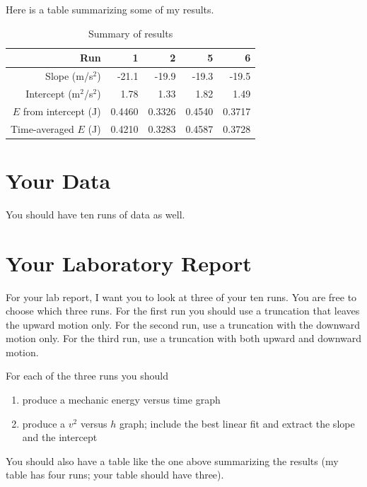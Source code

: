 Here is a table summarizing some of my results.
\begin{table}
	\centering
    \begin{tabular}{|r|r|r|r|r|}\hline
        Run & 1 & 2 & 5 & 6 \\ \hline
        Slope (m/s$^{2}$) & -21.1 & -19.9 & -19.3 & -19.5 \\
        Intercept (m$^{2}$/s$^{2}$) & 1.78 & 1.33 & 1.82 & 1.49 \\
        $E$ from intercept (J) & 0.4460 & 0.3326 & 0.4540 & 0.3717 \\
        Time-averaged $E$ (J) & 0.4210 & 0.3283 & 0.4587 & 0.3728 \\
        \hline
    \end{tabular}
    \caption{Summary of results}
    \label{table.07.results}
\end{table}
\section{Your Data}
You should have ten runs of data as well.
\newpage
\section{Your Laboratory Report}
For your lab report, I want you to look at three of your ten runs. You are free to choose which three runs. For the first run you should use a truncation that leaves the upward motion only. For the second run, use a truncation with the downward motion only. For the third run, use a truncation with both upward and downward motion.

For each of the three runs you should
\begin{enumerate}
    \item produce a mechanic energy versus time graph
    \item produce a $v^{2}$ versus $h$ graph; include the best linear fit and extract the slope and the intercept
\end{enumerate}
You should also have a table like the one above summarizing the results (my table has four runs; your table should have three).
\FloatBarrier
\newpage
